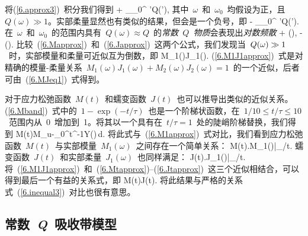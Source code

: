 将(\ref{6.approx3})~积分我们得到
\eq
\label{6.Mapprox}
+
\int_{\omega_0}^{\omega}
{\omega'Q(\omega')},
\en
其中~$\omega$~和~$\omega_0$~均假设为正，且~$Q(\omega)\gg 1$。实部柔量显然也有类似的结果，但会是一个负号，即
\eq
\label{6.Japprox}
-
\int_{\omega_0}^{\omega}
{\omega'Q(\omega')}.
\en
在~$\omega$~和~$\omega_0$~的范围内具有~$Q(\omega)\approx Q$~的{\em 常数~$Q$~物质\/}会表现出{\em 对数频散\/}
%
%
%
%
%
\eq
\label{6.MCONSTQ}
+\ln
\left(\right),
\en
\eq
\label{6.JCONSTQ}
-\ln
\left(\right).
\en
比较~(\ref{6.Mapprox})~和~(\ref{6.Japprox})~这两个公式，我们发现当~$Q(\mbox{$\omega$})\gg 1$~时，实部模量和柔量可近似互为倒数，即
\eq
\label{6.M1J1approx}
M_1(\omega)J_1(\omega).
\en
(\ref{6.M1J1approx})~式是对精确的模量-柔量关系~$M_1(\omega)J_1(\omega)+M_2(\omega)J_2(\omega)=1$~的一个近似，后者可由~(\ref{6.MJeq1})~式得到。

对于应力松弛函数~$M(t)$~和蠕变函数~$J(t)$~也可以推导出类似的近似关系。(\ref{6.Mband})~式中的~$1-\exp(-t/\tau)$~也是一个阶梯状函数，在~$1/10\leq t/\tau\leq 10$~范围内从~0~增加到~1。将其以一个具有在~$t/\tau =1$~处的陡峭阶梯替换，我们得到
\eq
M(t)\approx M_{\rm u}-\int_0^t\tau^{-1}Y(\tau)\,d\tau.
\en
将此式与~(\ref{6.M1approx})~式对比，我们看到应力松弛函数~$M(t)$~与实部模量~$M_1(\omega)$~之间存在一个简单关系：
\eq
\label{6.Mtapprox}
M(t)\approx\left.M_1(\omega)\right|_{/t}.
\en
蠕变函数~$J(t)$~和实部柔量~$J_1(\omega)$~也同样满足：
\eq
\label{6.Jtapprox}
J(t)\approx\left.J_1(\omega)\right|_{/t}.
\en
将~(\ref{6.M1J1approx})~和~(\ref{6.Mtapprox})--(\ref{6.Jtapprox})~这三个近似相结合，可以得到最后一个有益的关系式，即
\eq
\label{6.MtJtapprox}
M(t)J(t).
\en
将此结果与严格的关系式~(\ref{6.inequal3})~对比也很有意思。

\renewcommand{\thesubsection}{$\!\!\!\raise1.3ex\hbox{$\star$}\!\!$
\arabic{chapter}.\arabic{section}.\arabic{subsection}}
\subsection{常数~{\textbf{\textit{Q}}}~吸收带模型}
%
\renewcommand{\thesubsection}{\arabic{chapter}.\arabic{section}.\arabic{subsection}}

